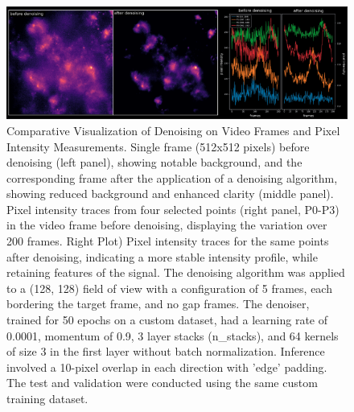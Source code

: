 \begin{figure}[!htb]
\begin{center}
\includegraphics[width=\linewidth]{figures/3.png}
\end{center}
\caption{Comparative Visualization of Denoising on Video Frames and Pixel Intensity Measurements. Single frame (512x512 pixels) before denoising (left panel), showing notable background, and the corresponding frame after the application of a denoising algorithm, showing reduced background and enhanced clarity (middle panel). Pixel intensity traces from four selected points (right panel, P0-P3) in the video frame before denoising, displaying the variation over 200 frames. Right Plot) Pixel intensity traces for the same points after denoising, indicating a more stable intensity profile, while retaining features of the signal. The denoising algorithm was applied to a (128, 128) field of view with a configuration of 5 frames, each bordering the target frame, and no gap frames. The denoiser, trained for 50 epochs on a custom dataset, had a learning rate of 0.0001, momentum of 0.9, 3 layer stacks (n\_stacks), and 64 kernels of size 3 in the first layer without batch normalization. Inference involved a 10-pixel overlap in each direction with 'edge' padding. The test and validation were conducted using the same custom training dataset.
}\label{fig:3}
\end{figure}

